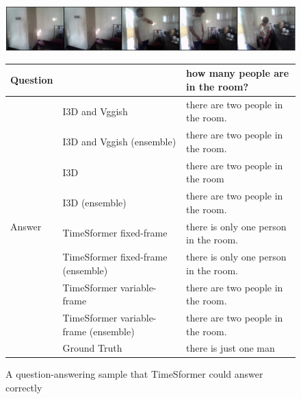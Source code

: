 \documentclass[letterpaper]{article}
\begin{document}
\begin{figure}[t]
 \centering
 \includegraphics[width=\textwidth]{./fig/DUHFG.png}
 \begin{tabular}{lll} \hline
  Question & & how many people are in the room? \\ \hline
  \multirow{9}{*}{Answer} & I3D and Vggish \cite{Li2021bridging} & there are two people in the room.\\
  & I3D and Vggish (ensemble) & there are two people in the room.\\
  & I3D & there are two people in the room\\
  & I3D (ensemble) & there are two people in the room.\\
  & TimeSformer fixed-frame & there is only one person in the room.\\
  & TimeSformer fixed-frame (ensemble) & there is only one person in the room.\\
  & TimeSformer variable-frame & there are two people in the room.\\
  & TimeSformer variable-frame (ensemble) & there are two people in the room.\\
  & Ground Truth & there is just one man \\ \hline
 \end{tabular}
 \caption{A question-answering sample that TimeSformer could answer correctly}
 \label{fig:good_sample}
\end{figure}
\end{document}
